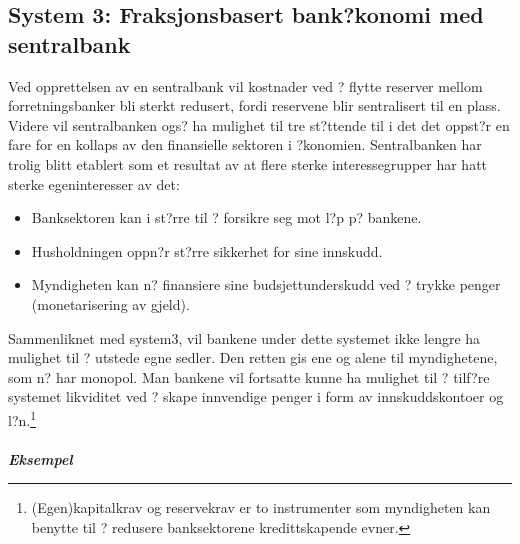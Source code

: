 \documentclass[a4paper,notitlepage]{article}
\begin{document}
\subsection{System 3: Fraksjonsbasert bank?konomi med sentralbank}
Ved opprettelsen av en sentralbank vil kostnader ved ? flytte reserver mellom forretningsbanker bli sterkt redusert, fordi reservene blir sentralisert til en plass. Videre vil sentralbanken ogs? ha mulighet til tre st?ttende til i det det oppst?r en fare for en kollaps av den finansielle sektoren i ?konomien. Sentralbanken har trolig blitt etablert som et resultat av at flere sterke interessegrupper har hatt sterke egeninteresser av det:
 \begin{itemize}
\item Banksektoren kan i st?rre til ? forsikre seg mot l?p p? bankene.
\item Husholdningen oppn?r st?rre sikkerhet for sine innskudd.
\item Myndigheten kan n? finansiere sine budsjettunderskudd ved ? trykke penger (monetarisering av gjeld).
\end{itemize}
Sammenliknet med system3, vil bankene under dette systemet ikke lengre ha mulighet til ? utstede egne sedler. Den retten gis ene og alene til myndighetene, som n? har monopol. Man bankene vil fortsatte kunne ha mulighet til ? tilf?re systemet likviditet ved ? skape innvendige penger i form av innskuddskontoer og l?n.\footnote{(Egen)kapitalkrav og reservekrav er to instrumenter som myndigheten kan benytte til ? redusere banksektorene kredittskapende evner.}\\
\noindent\textbf{\emph{\\ Eksempel}}\\
\end{document}
